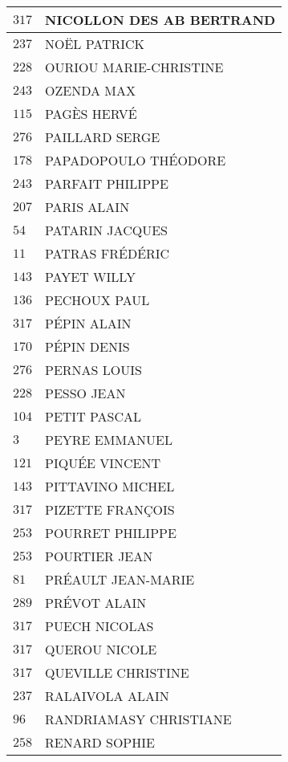 \begin{xltabular}{\linewidth}{|l|X|}
    \hline
    $317$ & NICOLLON DES AB BERTRAND \\
    \hline
    $237$ & NOËL PATRICK \\
    \hline
    $228$ & OURIOU MARIE-CHRISTINE \\
    \hline
    $243$ & OZENDA MAX \\
    \hline
    $115$ & PAGÈS HERVÉ \\
    \hline
    $276$ & PAILLARD SERGE \\
    \hline
    $178$ & PAPADOPOULO THÉODORE \\
    \hline
    $243$ & PARFAIT PHILIPPE \\
    \hline
    $207$ & PARIS ALAIN \\
    \hline
    $54$ & PATARIN JACQUES \\
    \hline
    $11$ & PATRAS FRÉDÉRIC \\
    \hline
    $143$ & PAYET WILLY \\
    \hline
    $136$ & PECHOUX PAUL \\
    \hline
    $317$ & PÉPIN ALAIN \\
    \hline
    $170$ & PÉPIN DENIS \\
    \hline
    $276$ & PERNAS LOUIS \\
    \hline
    $228$ & PESSO JEAN \\
    \hline
    $104$ & PETIT PASCAL \\
    \hline
    $3$ & PEYRE EMMANUEL \\
    \hline
    $121$ & PIQUÉE VINCENT \\
    \hline
    $143$ & PITTAVINO MICHEL \\
    \hline
    $317$ & PIZETTE FRANÇOIS \\
    \hline
    $253$ & POURRET PHILIPPE \\
    \hline
    $253$ & POURTIER JEAN \\
    \hline
    $81$ & PRÉAULT JEAN-MARIE \\
    \hline
    $289$ & PRÉVOT ALAIN \\
    \hline
    $317$ & PUECH NICOLAS \\
    \hline
    $317$ & QUEROU NICOLE \\
    \hline
    $317$ & QUEVILLE CHRISTINE \\
    \hline
    $237$ & RALAIVOLA ALAIN \\
    \hline
    $96$ & RANDRIAMASY CHRISTIANE \\
    \hline
    $258$ & RENARD SOPHIE \\

\end{xltabular}
